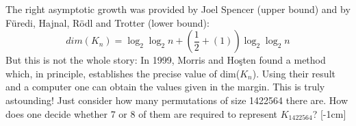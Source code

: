 \documentclass[10pt,twoside]{book}
\begin{document}
		The right asymptotic growth was provided by Joel Spencer (upper bound) and by Füredi, Hajnal, Rödl and Trotter (lower bound):
		$$dim(K_n) = \log_{2}\log_{2}n + (\frac{1}{2} + (1))\log_{2}\log_{2}n$$
		But this is not the whole story: In 1999, Morris and Ho\c{s}ten found a method which, in principle, establishes the precise value of dim($K_n$). Using their result and a computer one can obtain the values given in the margin. This is truly astounding! Just consider how many permutations of size 1422564 there are. How does one decide whether 7 or 8 of them are required to represent $K_{1422564}$?
\end{document}
